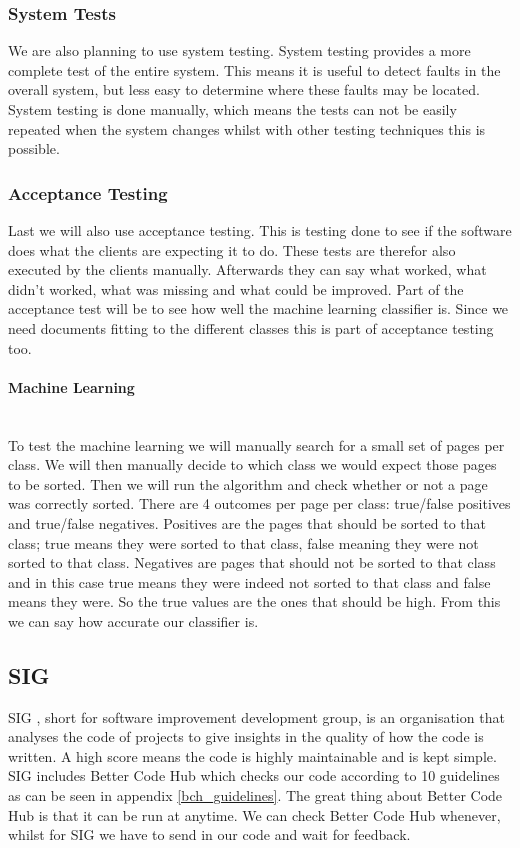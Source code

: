 \subsubsection{System Tests}
We are also planning to use system testing. System testing provides a more complete test of the entire system. This means it is useful to detect faults in the overall system, but less easy to determine where these faults may be located. System testing is done manually, which means the tests can not be easily repeated when the system changes whilst with other testing techniques this is possible.

\subsubsection{Acceptance Testing}
Last we will also use acceptance testing. This is testing done to see if the software does what the clients are expecting it to do. These tests are therefor also executed by the clients manually. Afterwards they can say what worked, what didn't worked, what was missing and what could be improved. Part of the acceptance test will be to see how well the machine learning classifier is. Since we need documents fitting to the different classes this is part of acceptance testing too.\\

\paragraph{Machine Learning} \\
To test the machine learning we will manually search for a small set of pages per class. We will then manually decide to which class we would expect those pages to be sorted. Then we will run the algorithm and check whether or not a page was correctly sorted. There are 4 outcomes per page per class: true/false positives and true/false negatives. Positives are the pages that should be sorted to that class; true means they were sorted to that class, false meaning they were not sorted to that class. Negatives are pages that should not be sorted to that class and in this case true means they were indeed not sorted to that class and false means they were. So the true values are the ones that should be high. From this we can say how accurate our classifier is. 

\subsection{SIG}
SIG \cite{sig}, short for software improvement development group, is an organisation that analyses the code of projects to give insights in the quality of how the code is written. A high score means the code is highly maintainable and is kept simple. SIG includes Better Code Hub \cite{better_code_hub} which checks our code according to 10 guidelines as can be seen in appendix \ref{bch_guidelines}. The great thing about Better Code Hub is that it can be run at anytime. We can check Better Code Hub whenever, whilst for SIG we have to send in our code and wait for feedback.